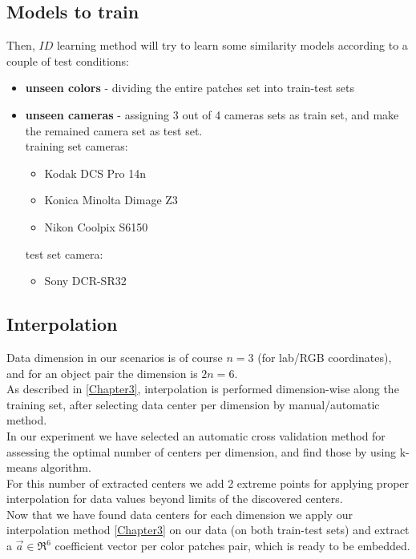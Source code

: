 \subsection{Models to train}
Then, $ID$ learning method will try to learn some similarity models according to a couple of test conditions:

\begin{itemize}
	\item \textbf{unseen colors} - dividing the entire patches set into train-test sets
	\item \textbf{unseen cameras} - assigning 3 out of 4 cameras sets as train set, and make the remained camera set as test set. \\
		training set cameras:
		\begin{itemize}
			\item Kodak DCS	Pro 14n
			\item Konica Minolta Dimage Z3
			\item Nikon Coolpix S6150
		\end{itemize}	
		
		test set camera:	
		\begin{itemize}
			\item Sony DCR-SR32
		\end{itemize}
		
\end{itemize}

\subsection{Interpolation}
Data dimension in our scenarios is of course $n=3$ (for lab/RGB \cite{RGB} coordinates), and for an object pair the dimension is $2n=6$. \\
As described in \ref{Chapter3}, interpolation is performed dimension-wise along the training set, after selecting data center per dimension by manual/automatic method.
\\
In our experiment we have selected an automatic cross validation \cite{cross validation} method for assessing the optimal number of centers per dimension, and find those by using k-means \cite{kmeans} algorithm.
\\
For this number of extracted centers we add 2 extreme points for applying proper interpolation for data values beyond limits of the discovered centers.
\\
Now that we have found data centers for each dimension we apply our interpolation method \ref{Chapter3} on our data (on both train-test sets) and extract a $\overrightarrow{a} \in \Re^6$ coefficient vector per color patches pair, which is ready to be embedded.



